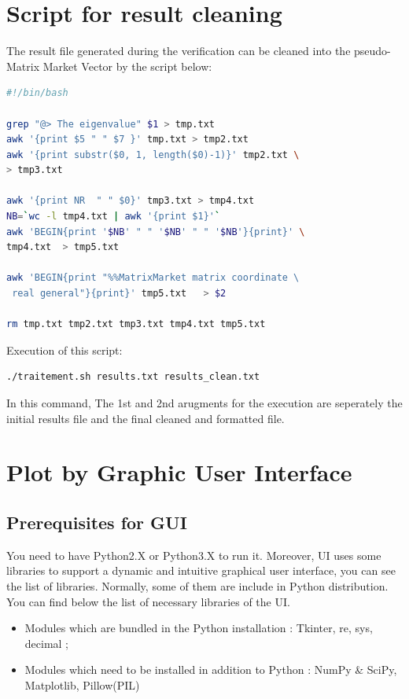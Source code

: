 \documentclass[a4paper, 10 pt]{report}
\begin{document}
	\section{Script for result cleaning}
	
	The result file generated during the verification can be cleaned into the pseudo-Matrix Market Vector by the script below:
	
	\begin{lstlisting}[language=bash,frame=single]
#!/bin/bash

grep "@> The eigenvalue" $1 > tmp.txt
awk '{print $5 " " $7 }' tmp.txt > tmp2.txt
awk '{print substr($0, 1, length($0)-1)}' tmp2.txt \
> tmp3.txt

awk '{print NR  " " $0}' tmp3.txt > tmp4.txt
NB=`wc -l tmp4.txt | awk '{print $1}'`
awk 'BEGIN{print '$NB' " " '$NB' " " '$NB'}{print}' \
tmp4.txt  > tmp5.txt

awk 'BEGIN{print "%%MatrixMarket matrix coordinate \
 real general"}{print}' tmp5.txt   > $2

rm tmp.txt tmp2.txt tmp3.txt tmp4.txt tmp5.txt
   \end{lstlisting}
		
	Execution of this script:
	
	\begin{lstlisting}[language=bash,frame=single]
   ./traitement.sh results.txt results_clean.txt
	\end{lstlisting}
	
	In this command, The 1st and 2nd arugments for the execution are seperately the initial results file and the final cleaned and formatted file.
	
	\section{Plot by Graphic User Interface}

	\subsection{Prerequisites for GUI}
	
	You need to have Python2.X or Python3.X to run it. Moreover, UI uses some libraries to support a dynamic and intuitive graphical user interface, you can see the list of libraries. Normally, some of them are include in Python distribution. You can find below the list of necessary libraries of the UI.
	
	\begin{itemize}
		\item Modules which are bundled in the Python installation : Tkinter, re, sys, decimal ;
		\item Modules which need to be installed in addition to Python : NumPy \& SciPy, Matplotlib, Pillow(PIL)
	\end{itemize}
\end{document}
